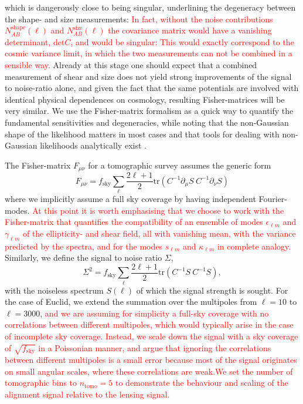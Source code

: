 \documentclass[a4paper,fleqn,usenatbib]{mnras}
\newcommand\spirou[1]{\textcolor{red}{#1}}
\begin{document}
which is dangerously close to being singular, underlining the degeneracy between the shape- and size measurements: \spirou{In fact, without the noise contributions $N^\mathrm{shape}_{AB}(\ell)$ and $N^\mathrm{size}_{AB}(\ell)$ the covariance matrix would have a vanishing determinant, $\mathrm{det}C$, and would be singular: This would exactly correspond to the cosmic variance limit, in which the two measurements can not be combined in a sensible way.} Already at this stage one should expect that a combined measurement of shear and size does not yield strong improvements of the signal to noise-ratio alone, and given the fact that the same potentials are involved with identical physical dependences on cosmology, resulting Fisher-matrices will be very similar. We use the Fisher-matrix formalism as a quick way to quantify the fundamental sensitivities and degeneracies, while noting that the non-Gaussian shape of the likelihood matters in most cases and that tools for dealing with non-Gaussian likelihoods analytically exist \citep{takada_impact_2009, sellentin_non-gaussian_2015}.

The Fisher-matrix $F_{\mu\nu}$ for a tomographic survey assumes the generic form
\begin{equation}
F_{\mu\nu} = f_\mathrm{sky}\sum_\ell\frac{2\ell+1}{2}\mathrm{tr}\left(C^{-1}\partial_\mu S\:C^{-1}\partial_\nu S\right)
\end{equation}
where we implicitly assume a full sky coverage by having independent Fourier-modes. \spirou{At this point it is worth emphasising that we choose to work with the Fisher-matrix that quantifies the compatibility of an ensemble of modes $\epsilon_{\ell m}$ and $\gamma_{\ell m}$ of the ellipticity- and shear field, all with vanishing mean, with the variance predicted by the spectra, and for the modes $s_{\ell m}$ and $\kappa_{\ell m}$ in complete analogy.} Similarly, we define the signal to noise ratio $\Sigma$,
\begin{equation}
\Sigma^2 = f_\mathrm{sky}\sum_\ell\frac{2\ell+1}{2}\mathrm{tr}\left(C^{-1}S\:C^{-1}S\right),
\label{eqn_s2n}
\end{equation}
with the noiseless spectrum $S(\ell)$ of which the signal strength is sought. For the case of Euclid, we extend the summation over the multipoles from $\ell=10$ to $\ell=3000$, \spirou{and we are assuming for simplicity a full-sky coverage with no correlations between different multipoles, which would typically arise in the case of incomplete sky coverage. Instead, we scale down the signal with a sky coverage of $\sqrt{f_\mathrm{sky}}$ in a Poissonian manner, and argue that ignoring the correlations between different multipoles is a small error because most of the signal originates on small angular scales, where these correlations are weak.We set the number of tomographic bins to $n_\mathrm{tomo} = 5$ to demonstrate the behaviour and scaling of the alignment signal relative to the lensing signal.}
\end{document}
